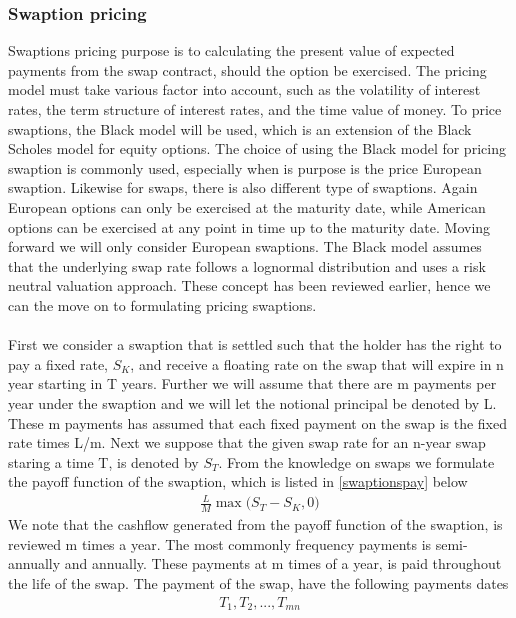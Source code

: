 \subsubsection{Swaption pricing}
Swaptions pricing purpose is to calculating the present value of expected payments from the swap contract,
should the option be exercised. The pricing model must take various factor into account, such as the
volatility of interest rates, the term structure of interest rates, and the time value of money. 
To price swaptions, the Black model will be used, which is an extension of the Black Scholes
model for equity options. The choice of using the Black model for pricing swaption is commonly used, especially when
is purpose is the price European swaption. Likewise for swaps, there is also different type of swaptions. 
Again European options can only be exercised at the maturity date, while American options can be exercised
at any point in time up to the maturity date. Moving forward we will only consider European swaptions. 
The Black model assumes that the underlying swap rate follows a lognormal distribution and uses a 
risk neutral valuation approach. These concept has been reviewed earlier, hence we can the move on to 
formulating pricing swaptions.
\\\\
First we consider a swaption that is settled such that the holder has the right to pay a fixed rate, $S_K$, 
and receive a floating rate on the swap that will expire in n year starting in T years.
Further we will assume that there are m payments 
per year under the swaption and we will let the notional principal be denoted by L. These m payments has
assumed that each fixed payment on the swap is the fixed rate times L/m. Next we suppose that 
the given swap rate for an n-year swap staring a time T, is denoted by $S_T$. 
From the knowledge on swaps we formulate the payoff function of the swaption, which is listed in
\autoref{swaptionspay} below
\begin{align}
    \frac{L}{M} \max \Big( S_T - S_K, 0 \Big)
    \label{swaptionspay}
\end{align}
We note that the cashflow generated from the payoff function of the swaption, is reviewed m times 
a year. The most commonly frequency payments is semi-annually and annually. These payments at m times
of a year, is paid throughout the life of the swap. The payment of the swap, have the following 
payments dates 
\begin{align*}
    T_1,T_2,...,T_{mn}
\end{align*}
